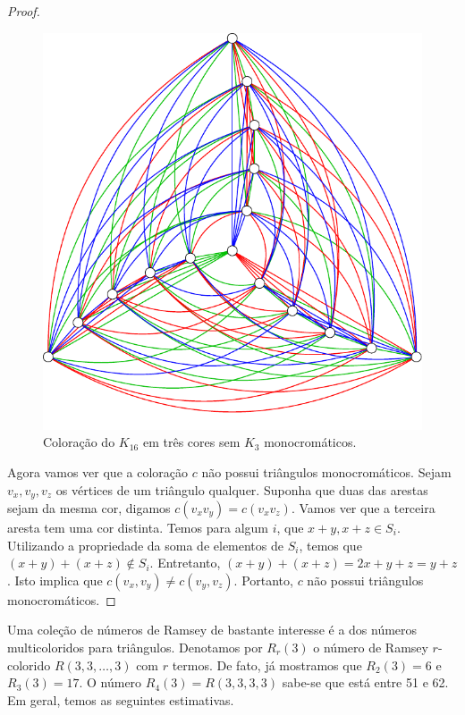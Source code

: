 \begin{proof}
\begin{figure}[ht!]
\centering
\includegraphics{figures/2_prelim_3_r333lb}
\caption{Coloração do $K_{16}$ em três cores sem $K_3$ monocromáticos.}
\label{prelim:fig:exr333}
\end{figure}

Agora vamos ver que a coloração $c$ não possui triângulos monocromáticos.
Sejam $v_x, v_y, v_z$ os vértices de um triângulo qualquer. Suponha que duas das arestas sejam da mesma cor, digamos $c(v_x v_y) = c(v_x v_z)$. Vamos ver que a terceira aresta tem uma cor distinta. Temos para algum $i$, que $x + y, x + z \in S_i$. Utilizando a propriedade da soma de elementos de $S_i$,
temos que $(x+y) + (x+z) \not\in S_i$. Entretanto, $(x+y) +(x+z) = 2x + y + z = y + z$. Isto implica que $c(v_x,v_y)\neq c(v_y,v_z)$. Portanto, $c$ não possui triângulos monocromáticos.
\end{proof}

Uma coleção de números de Ramsey de bastante interesse é a dos números multicoloridos para triângulos. Denotamos por $R_r(3)$ o número de Ramsey $r$-colorido $R(3,3,\dots,3)$ com $r$ termos. De fato, já mostramos que $R_2(3) = 6$ e $R_3(3) = 17$. O número $R_4(3) = R(3,3,3,3)$ sabe-se que está entre 51 e 62. Em geral, temos as seguintes estimativas.

